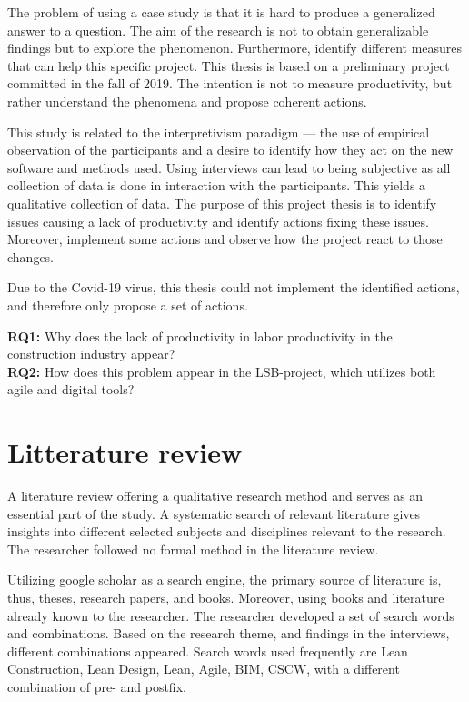 The problem of using a case study is that it is hard to produce a generalized answer to a question. The aim of the research is not to obtain generalizable findings but to explore the phenomenon. Furthermore, identify different measures that can help this specific project. This thesis is based on a preliminary project committed in the fall of 2019. The intention is not to measure productivity, but rather understand the phenomena and propose coherent actions.

This study is related to the interpretivism paradigm — the use of empirical observation of the participants and a desire to identify how they act on the new software and methods used. Using interviews can lead to being subjective as all collection of data is done in interaction with the participants. This yields a qualitative collection of data. The purpose of this project thesis is to identify issues causing a lack of productivity and identify actions fixing these issues. Moreover, implement some actions and observe how the project react to those changes. 

Due to the Covid-19 virus, this thesis could not implement the identified actions, and therefore only propose a set of actions.

{\noindent \bf RQ1:} Why does the lack of productivity in labor productivity in the construction industry appear? \\
{\bf RQ2:} How does this problem appear in the LSB-project, which utilizes both agile and digital tools?

\section{Litterature review}
A literature review offering a qualitative research method and serves as an essential part of the study. A systematic search of relevant literature gives insights into different selected subjects and disciplines relevant to the research. The researcher followed no formal method in the literature review.

Utilizing google scholar as a search engine, the primary source of literature is, thus, theses, research papers, and books. Moreover, using books and literature already known to the researcher. The researcher developed a set of search words and combinations. Based on the research theme, and findings in the interviews, different combinations appeared. Search words used frequently are Lean Construction, Lean Design, Lean, Agile, BIM, CSCW, with a different combination of pre- and postfix. 

